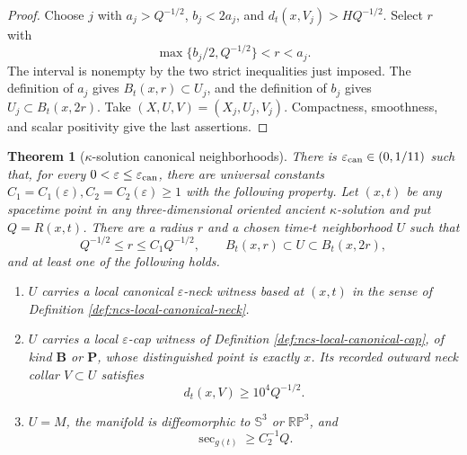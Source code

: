 \documentclass[10pt]{coll-l}
\newcommand{\Sph}{\mathbb{S}}
\newtheorem{theorem}{Theorem}[chapter]
\theoremstyle{definition}
\theoremstyle{remark}
\numberwithin{section}{chapter}
\numberwithin{equation}{chapter}
\begin{document}
\begin{proof}
Choose $j$ with $a_j>Q^{-1/2}$, $b_j<2a_j$, and
$d_t(x,V_j)>HQ^{-1/2}$.  Select $r$ with
\begin{equation}
             \max\{b_j/2,Q^{-1/2}\}<r<a_j.           \label{eq:ncs-cap-radius-choice}
\end{equation}
The interval is nonempty by the two strict inequalities just imposed.
The definition of $a_j$ gives
$B_t(x,r)\subset U_j$, and the definition of $b_j$ gives
$U_j\subset B_t(x,2r)$.  Take $(X,U,V)=(X_j,U_j,V_j)$.  Compactness,
smoothness, and scalar positivity give the last assertions.
\end{proof}

\begin{theorem}[$\kappa$-solution canonical neighborhoods]
\label{thm:ncs-kappa-canonical-neighborhood}
There is $\varepsilon_{\rm can}\in(0,1/11)$ such that, for every
$0<\varepsilon\leq\varepsilon_{\rm can}$, there are universal constants
$C_1=C_1(\varepsilon),C_2=C_2(\varepsilon)\geq1$ with the following
property.  Let $(x,t)$ be any spacetime point in any three-dimensional
\emph{oriented} ancient $\kappa$-solution and put $Q=R(x,t)$.  There are a
radius $r$ and a chosen time-$t$ neighborhood $U$ such that
\begin{equation}
 Q^{-1/2}\leq r\leq C_1Q^{-1/2},\qquad
 B_t(x,r)\subset U\subset B_t(x,2r),                  \label{eq:ncs-canonical-ball-sandwich}
\end{equation}
and at least one of the following holds.
\begin{enumerate}
\item[(a)] $U$ carries a local canonical $\varepsilon$-neck witness based
      at $(x,t)$ in the sense of Definition
      \ref{def:ncs-local-canonical-neck}.
\item[(b)] $U$ carries a local $\varepsilon$-cap witness of Definition
      \ref{def:ncs-local-canonical-cap}, of kind $\mathbf B$ or $\mathbf P$,
      whose distinguished point is exactly $x$.  Its recorded outward neck
      collar $V\subset U$ satisfies
      \begin{equation}
           d_t(x,V)\geq10^4Q^{-1/2}.                  \label{eq:ncs-deep-in-cap}
      \end{equation}
\item[(c)] $U=M$, the manifold is diffeomorphic to $\Sph^3$ or
      $\mathbb{RP}^3$, and
      \begin{equation}
                           \sec_{g(t)}\geq C_2^{-1}Q.   \label{eq:ncs-canonical-positive-sec}
      \end{equation}

\end{enumerate}
\end{theorem}
\end{document}
